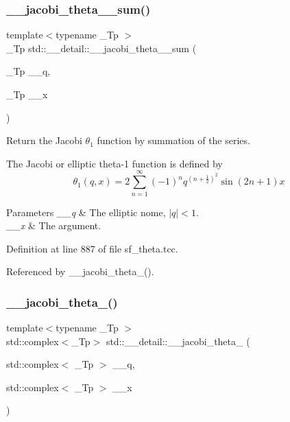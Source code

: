 \subsubsection{\texorpdfstring{\+\_\+\+\_\+jacobi\+\_\+theta\+\_\+\_\+sum()}{\_\_jacobi\_theta\_1\_sum()}}
{\footnotesize\ttfamily template$<$typename \+\_\+\+Tp $>$ \\
\+\_\+\+Tp std\+::\+\_\+\+\_\+detail\+::\+\_\+\+\_\+jacobi\+\_\+theta\+\_\+\_\+sum (\begin{DoxyParamCaption}\item[{\+\_\+\+Tp}]{\+\_\+\+\_\+q,  }\item[{\+\_\+\+Tp}]{\+\_\+\+\_\+x }\end{DoxyParamCaption})}

Return the Jacobi $ \theta_1 $ function by summation of the series.

The Jacobi or elliptic theta-\/1 function is defined by \[ \theta_1(q,x) = 2\sum_{n=1}^{\infty}(-1)^n q^{(n+\frac{1}{2})^2}\sin{(2n+1)x} \]


\begin{DoxyParams}{Parameters}
{\em \+\_\+\+\_\+q} & The elliptic nome, $ |q| < 1 $. \\
\hline
{\em \+\_\+\+\_\+x} & The argument. \\
\hline
\end{DoxyParams}


Definition at line 887 of file sf\+\_\+theta.\+tcc.



Referenced by \+\_\+\+\_\+jacobi\+\_\+theta\+\_().

\mbox{\label{namespacestd_1_1____detail_aba908b579191a0c5f55be7db84ece5c5}} 
\subsubsection{\texorpdfstring{\+\_\+\+\_\+jacobi\+\_\+theta\+\_()}{\_\_jacobi\_theta\_2()}\hspace{0.1cm}{\footnotesize\ttfamily [1/2]}}
{\footnotesize\ttfamily template$<$typename \+\_\+\+Tp $>$ \\
std\+::complex$<$\+\_\+\+Tp$>$ std\+::\+\_\+\+\_\+detail\+::\+\_\+\+\_\+jacobi\+\_\+theta\+\_ (\begin{DoxyParamCaption}\item[{std\+::complex$<$ \+\_\+\+Tp $>$}]{\+\_\+\+\_\+q,  }\item[{std\+::complex$<$ \+\_\+\+Tp $>$}]{\+\_\+\+\_\+x }\end{DoxyParamCaption})}

